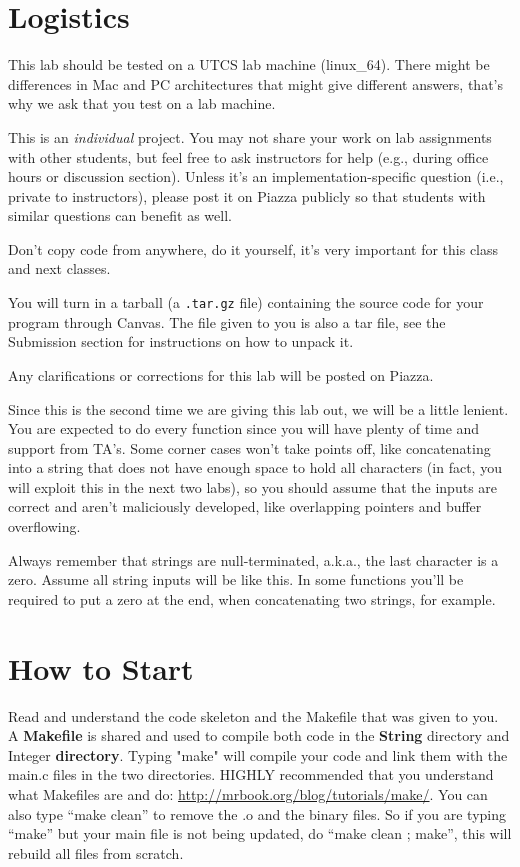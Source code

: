 \documentclass[11pt]{article}
\begin{document}
\section{Logistics}

This lab should be tested on a UTCS lab machine (linux\_64). There might be differences in Mac and PC architectures that might give different answers, that's why we ask that you test on a lab machine.

This is an {\it individual} project.  You may not share your work on lab
assignments with other students, but feel free to ask instructors for help (e.g.,
during office hours or discussion section).  Unless it's an implementation-specific
question (i.e., private to instructors),  please post it on Piazza publicly so that
students with similar questions can benefit as well.

Don't copy code from anywhere, do it yourself, it's very important for this class and next classes.

You will turn in a tarball (a {\tt .tar.gz} file) containing the source code for your program through Canvas. The file given to you is also a tar file, see the Submission section for instructions on how to unpack it.

Any clarifications or corrections for this lab will be posted on Piazza.

Since this is the second time we are giving this lab out, we will be a little lenient. You are expected to do every function since you will have plenty of time and support from TA's. Some corner cases won't take points off, like concatenating into a string that does not have enough space to hold all characters (in fact, you will exploit this in the next two labs), so you should assume that the inputs are correct and aren't maliciously developed, like overlapping pointers and buffer overflowing.

Always remember that strings are null-terminated, a.k.a., the last character is a zero. Assume all string inputs will be like this. In some functions you'll be required to put a zero at the end, when concatenating two strings, for example.



\section{How to Start}

Read and understand the code skeleton and the Makefile that was given to you.
A \textbf{Makefile} is shared and used to compile both code in the
\textbf{String} directory and Integer \textbf{directory}.
Typing "make" will compile your code and link them with the main.c files
in the two directories.
HIGHLY recommended that you understand what Makefiles are and do:
\url{http://mrbook.org/blog/tutorials/make/}.
You can also type ``make clean'' to remove the .o and the binary files.
So if you are typing ``make'' but your main file is not being updated,
do ``make clean ; make'', this will rebuild all files from scratch.
\end{document}
